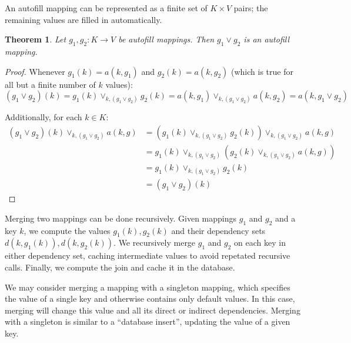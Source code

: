 \documentclass{article}
\newtheorem{theorem}{Theorem}
\begin{document}
        An autofill mapping can be represented as a finite set of $K \times V$ pairs; the remaining values are filled in automatically.

        \begin{theorem}
          Let $g_1, g_2 : K \rightarrow V$ be autofill mappings. Then $g_1 \vee g_2$ is an autofill mapping.
        \end{theorem}

        \begin{proof}

          Whenever $g_1(k) = a(k, g_1)$ and $g_2(k) = a(k, g_2)$ (which is true for all but a finite number of $k$ values):
           $$(g_1 \vee g_2)(k) = g_1(k) \vee_{k, (g_1 \vee g_2)} g_2(k) = a(k, g_1) \vee_{k, (g_1 \vee g_2)} a(k, g_2) = a(k, g_1 \vee g_2)$$

          Additionally, for each $k \in K$:
          \begin{align*}
            (g_1 \vee g_2)(k) \vee_{k, (g_1 \vee g_2)} a(k, g) 
            &= (g_1(k) \vee_{k, (g_1 \vee g_2)} g_2(k)) \vee_{k, (g_1 \vee g_2)} a(k, g) \\
            &= g_1(k) \vee_{k, (g_1 \vee g_2)} (g_2(k) \vee_{k, (g_1 \vee g_2)} a(k, g)) \\
            &= g_1(k) \vee_{k, (g_1 \vee g_2)} g_2(k) \\
            &= (g_1 \vee g_2)(k)
          \end{align*}
        \end{proof}


        Merging two mappings can be done recursively. Given mappings $g_1$ and $g_2$ and a key $k$, we compute the values $g_1(k), g_2(k)$ and their dependency sets $d(k, g_1(k)), d(k, g_2(k))$. We recursively merge $g_1$ and $g_2$ on each key in either dependency set, caching intermediate values to avoid repetated recursive calls. Finally, we compute the join and cache it in the database.

        We may consider merging a mapping with a singleton mapping, which specifies the value of a single key and otherwise contains only default values. In this case, merging will change this value and all its direct or indirect dependencies. Merging with a singleton is similar to a ``database insert'', updating the value of a given key.
\end{document}
